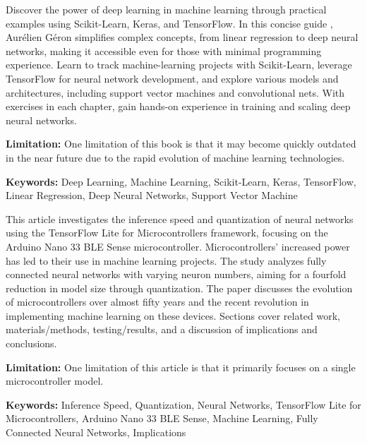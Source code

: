 { 
	Discover the power of deep learning in machine learning through practical examples using Scikit-Learn, Keras, and TensorFlow. In this concise guide \cite{Geron:2022}, Aurélien Géron simplifies complex concepts, from linear regression to deep neural networks, making it accessible even for those with minimal programming experience. Learn to track machine-learning projects with Scikit-Learn, leverage TensorFlow for neural network development, and explore various models and architectures, including support vector machines and convolutional nets. With exercises in each chapter, gain hands-on experience in training and scaling deep neural networks.
	
	\bigskip
	
	\textbf{Limitation:} One limitation of this book is that it may become quickly outdated in the near future due to the rapid evolution of machine learning technologies. 
	
	\scriptsize{\textbf{Keywords:} Deep Learning, Machine Learning, Scikit-Learn, Keras, TensorFlow, Linear Regression, Deep Neural Networks, Support Vector Machine}
}


{ 
	This article \cite{Dokic:2020} investigates the inference speed and quantization of neural networks using the TensorFlow Lite for Microcontrollers framework, focusing on the Arduino Nano 33 BLE Sense microcontroller. Microcontrollers' increased power has led to their use in machine learning projects. The study analyzes fully connected neural networks with varying neuron numbers, aiming for a fourfold reduction in model size through quantization. The paper discusses the evolution of microcontrollers over almost fifty years and the recent revolution in implementing machine learning on these devices. Sections cover related work, materials/methods, testing/results, and a discussion of implications and conclusions.
	
	\bigskip
	
	\textbf{Limitation:} One limitation of this article is that it primarily focuses on a single microcontroller model.
	
	\scriptsize{\textbf{Keywords:} Inference Speed, Quantization, Neural Networks, TensorFlow Lite for Microcontrollers, Arduino Nano 33 BLE Sense, Machine Learning, Fully Connected Neural Networks, Implications}
}
